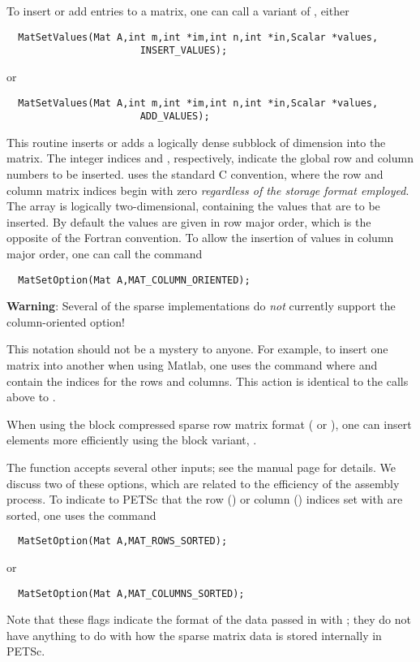 To insert or add entries to a matrix, one can call a variant of , either 
\begin{verbatim}
  MatSetValues(Mat A,int m,int *im,int n,int *in,Scalar *values,
                       INSERT_VALUES);
\end{verbatim}
or 
\begin{verbatim}
  MatSetValues(Mat A,int m,int *im,int n,int *in,Scalar *values,
                       ADD_VALUES);
\end{verbatim}
This routine inserts or adds a logically dense subblock of dimension
 into the 
matrix. The integer indices  and , respectively, indicate the 
global row and column numbers to be inserted.   uses the 
standard C convention, where the row and column matrix indices begin with 
zero {\em regardless of the storage format employed}.   The array 
 is logically two-dimensional, containing the values that are 
to be inserted.   
By default the values are given in row major order, which is the opposite 
of the Fortran convention. To allow the insertion of values in column 
major order, one can call the command 
\begin{verbatim}
  MatSetOption(Mat A,MAT_COLUMN_ORIENTED);
\end{verbatim}
{\bf Warning}: Several of the sparse implementations do {\em not} currently support
the column-oriented option!

This notation should not be a mystery to anyone. For example, 
to insert one matrix into another when using Matlab, one uses the command 
 where  and  contain the indices for the
rows and columns. This action is identical to the calls above to 
.

When using the block compressed sparse row matrix format ( or
), one can insert elements more efficiently using the block
variant, . 

The function  accepts several other inputs; see
the manual page for details. We
discuss two of these options, which are related to the efficiency of the
assembly process.  To indicate to PETSc that the row () or
column () indices set with  are sorted,
one uses the command  
\begin{verbatim}
  MatSetOption(Mat A,MAT_ROWS_SORTED);
\end{verbatim}
or 
\begin{verbatim}
  MatSetOption(Mat A,MAT_COLUMNS_SORTED);
\end{verbatim}
Note that these flags indicate the format of the data passed in with 
; they do not have anything to do with how the sparse
matrix data is stored internally in PETSc.

